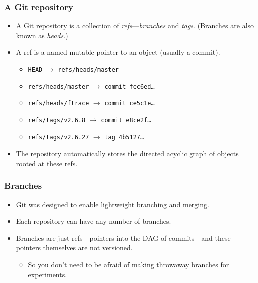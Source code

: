 \documentclass{beamer}
\begin{document}
\begin{frame}
  \frametitle{A Git repository}
  \begin{itemize}
  \item A Git repository is a collection of
    \emph{refs}---\emph{branches} and \emph{tags}.  (Branches are also
    known as \emph{heads}.)
  \item A ref is a named mutable pointer to an object (usually a
    commit).
    \begin{itemize}
    \item \texttt{HEAD} $\to$ \texttt{refs/heads/master}
    \item \texttt{refs/heads/master} $\to$ \texttt{commit fec6ed\ldots}
    \item \texttt{refs/heads/ftrace} $\to$ \texttt{commit ce5c1e\ldots}
    \item \texttt{refs/tags/v2.6.8} $\to$ \texttt{commit e8ce2f\ldots}
    \item \texttt{refs/tags/v2.6.27} $\to$ \texttt{tag 4b5127\ldots}
    \end{itemize}
  \item The repository automatically stores the directed acyclic graph
    of objects rooted at these refs.
  \end{itemize}
\end{frame}

\begin{frame}
  \frametitle{Branches}

  \begin{itemize}
  \item Git was designed to enable lightweight branching and merging.
  \item Each repository can have any number of branches.
  \item Branches are just refs---pointers into the DAG of
    commits---and these pointers themselves are not versioned.
    \begin{itemize}
    \item So you don't need to be afraid of making throwaway branches
      for experiments.
    \end{itemize}
  \end{itemize}
\end{frame}
\end{document}
